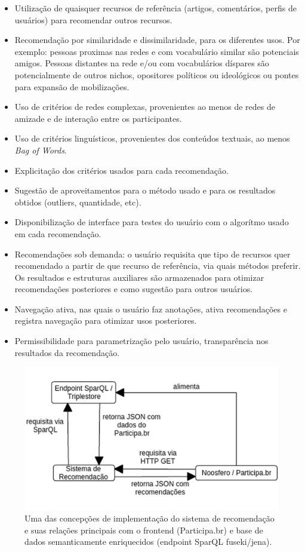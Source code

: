 \documentclass[a4paper, 11pt]{article} %
\begin{document}
\begin{itemize}
    \item Utilização de quaisquer recursos de referência (artigos, comentários, perfis de usuários) para recomendar outros recursos.
    \item Recomendação por similaridade e dissimilaridade, para os diferentes usos. Por exemplo: pessoas proximas nas redes e com vocabulário similar são potenciais amigos. Pessoas distantes na rede e/ou com vocabulários díspares são potencialmente de outros nichos, opositores políticos ou ideológicos ou pontes para expansão de mobilizações.
    \item Uso de critérios de redes complexas, provenientes ao menos de redes de amizade e de interação entre os participantes.
    \item Uso de critérios linguísticos, provenientes dos conteúdos textuais, ao menos \emph{Bag of Words}.
    \item Explicitação dos critérios usados para cada recomendação.
    \item Sugestão de aproveitamentos para o método usado e para os resultados obtidos (outliers, quantidade, etc).
    \item Disponibilização de interface para testes do usuário com o algorítmo usado em cada recomendação.
    \item Recomendações sob demanda: o usuário requisita que tipo de recursos quer recomendado a partir de que recurso de referência, via quais métodos preferir. Os resultados e estruturas auxiliares são armazenados para otimizar recomendações posteriores e como sugestão para outros usuários.
    \item Navegação ativa, nas quais o usuário faz anotações, ativa recomendações e registra navegação para otimizar usos posteriores.
    \item Permissibilidade para parametrização pelo usuário, transparência nos resultados da recomendação.
\end{itemize}
\begin{figure}[H]
  \centering
    \includegraphics[width=.7\textwidth]{sr.png}
  \caption{\small Uma das concepções de implementação do sistema de recomendação e suas relações principais com o frontend (Participa.br) e base de dados semanticamente enriquecidos (endpoint SparQL fuseki/jena).}\label{fig:rec}
\end{figure}
\end{document}

